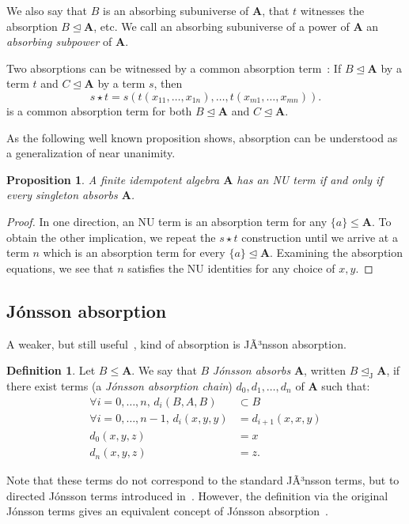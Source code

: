 \documentclass{amsart}
\theoremstyle{plain}
\newtheorem{proposition}[theorem]{Proposition}
\theoremstyle{definition}
\newtheorem{definition}[theorem]{Definition}
\begin{document}
We also say that $B$ is an absorbing subuniverse of ${{\mathbf{A}}}$, that $t$ witnesses
the absorption $B \operatorname{\trianglelefteq} {{\mathbf{A}}}$, etc. We call an absorbing subuniverse of a
power of ${{\mathbf{A}}}$ an \emph{absorbing subpower} of ${{\mathbf{A}}}$.

Two absorptions can be witnessed by a common absorption term~\cite{barto-kozik-cyclic-terms-and-csp}: If $B \operatorname{\trianglelefteq}{{\mathbf{A}}}$ by a term $t$ and $C\operatorname{\trianglelefteq} {{\mathbf{A}}}$ by
a term $s$, then
\[
  s\star t= s(t(x_{11},\dots,x_{1n}),\dots,t(x_{m1},\dots,x_{mn})).
\]
 is a common absorption term for both $B\operatorname{\trianglelefteq}{{\mathbf{A}}}$ and $C\operatorname{\trianglelefteq} {{\mathbf{A}}}$.
  

As the following well known proposition 
shows, absorption can be understood as a generalization of near unanimity.

\begin{proposition} \label{abs-and-nu}
A finite idempotent algebra ${{\mathbf{A}}}$ has an NU term if and
only if every singleton absorbs ${{\mathbf{A}}}$.
\end{proposition}
\begin{proof}
  In one direction, an NU term is an absorption term for any $\{a\}\leq
  {{\mathbf{A}}}$.
  To obtain the other implication, we repeat the $s\star t$ construction until
  we arrive at a term $n$ which is an absorption term for every $\{a\}\operatorname{\trianglelefteq}
  {{\mathbf{A}}}$. Examining the absorption equations, we see that 
  $n$ satisfies the NU identities for any choice of $x,y$.
\end{proof}

\subsection{J\'onsson absorption}
A weaker, but still useful~\cite{cd-implies-bw}, kind of absorption is
 JÃ³nsson  absorption. 
 
\begin{definition} \label{def-jonsson-abs}
Let $B\leq{{\mathbf{A}}}$. We say that $B$ \emph{J\'onsson absorbs}
 ${{\mathbf{A}}}$, written $B \operatorname{\trianglelefteq_J} {{\mathbf{A}}}$, if there exist  terms (a \emph{J\'onsson absorption chain}) $d_0,d_1,\dots,d_n$ of ${{\mathbf{A}}}$ such that:
\begin{align*}
  \forall i=0,\dots,n,\,d_i(B,A,B)&\subset B\\
  \forall i=0,\dots,n-1,\,d_i(x,y,y)&=d_{i+1}(x,x,y)\\
  d_0(x,y,z)&=x\\
  d_n(x,y,z)&=z.
\end{align*}
\end{definition}
Note that these terms do not correspond to the standard JÃ³nsson terms, but to
directed J\'onsson terms introduced in~\cite{directed-jonsson}. However, the definition via the original J\'onsson terms gives an equivalent concept of J\'onsson absorption~\cite{directed-jonsson}.
\end{document}
